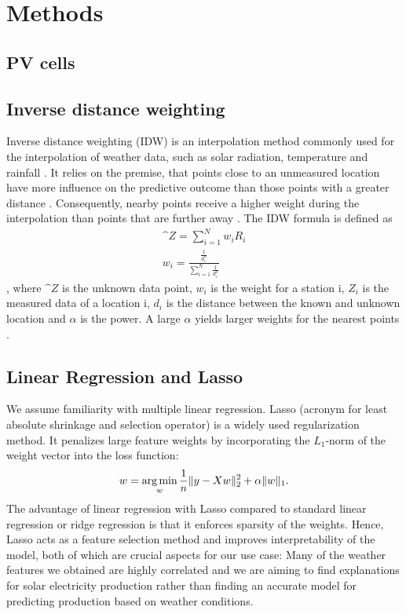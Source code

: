 \documentclass{article}
\begin{document}
\section{Methods}

\subsection{PV cells}

\subsection{Inverse distance weighting}
Inverse distance weighting (IDW) is an interpolation method commonly used for the interpolation of weather data, such as solar radiation, temperature and rainfall \cite{Loghmari2018} \cite{Cao2009} \cite{Chen2012}. It relies on the premise, that points close to an unmeasured location have more influence on the predictive outcome than those points with a greater distance \cite{Chen2012}. Consequently, nearby points receive a higher weight during the interpolation than points that are further away \cite{Lu2008}. The IDW formula is defined as
\begin{align}
    \^{Z} = \sum_{i=1}^N w_iR_i \\
    w_i = \frac{\frac{1}{d_i^\alpha}}{\sum_{i=1}^N \frac{1}{d_i^\alpha}}
\end{align} \cite{Chen2012}, where $\^{Z}$ is the unknown data point, $w_i$ is the weight for a station i, $Z_i$ is the measured data of a location i, $d_i$ is the distance between the known and unknown location and $\alpha$ is the power. A large $\alpha$ yields larger weights for the nearest points \cite{Lu2008}.

\subsection{Linear Regression and Lasso}
We assume familiarity with multiple linear regression. Lasso (acronym for least absolute shrinkage and selection operator) is a widely used regularization method. It penalizes large feature weights by incorporating the $L_1$-norm of the weight vector into the loss function: $$w = \underset{w}{\text{arg\,min}} \, \frac{1}{n} \|y - Xw\|_2^2 + \alpha \|w\|_1.$$ The advantage of linear regression with Lasso compared to standard linear regression or ridge regression is that it enforces sparsity of the weights. Hence, Lasso acts as a feature selection method and improves interpretability of the model, both of which are crucial aspects for our use case: Many of the weather features we obtained are highly correlated and we are aiming to find explanations for solar electricity production rather than finding an accurate model for predicting production based on weather conditions.
\end{document}
